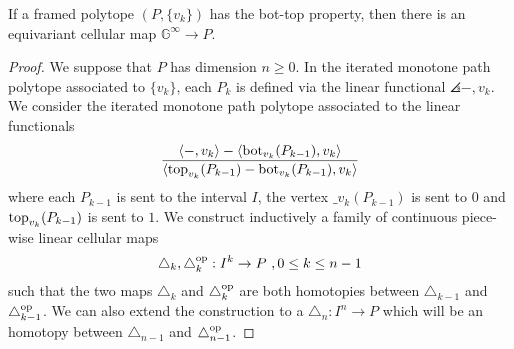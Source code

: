 \begin{theorem}
	\label{thm:map-from-the-globe}
	If a framed polytope $(P,\{v_k\})$ has the bot-top property, then there is an equivariant cellular map $\mathbb{G}^\infty \to P$.
\end{theorem}

\begin{proof}
	We suppose that $P$ has dimension $n\geq 0$. 
	In the iterated monotone path polytope associated to $\{v_k\}$, each $P_k$ is defined via the linear functional $\angles{-,v_k}$.
	We consider the iterated monotone path polytope associated to the linear functionals
	\begin{equation} \label{eq:new-projection}
		\frac{\langle-,v_k\rangle-\langle\operatorname{bot}_{v_k}(P_{k-1}),v_k\rangle}{\langle\operatorname{top}_{v_k}(P_{k-1})-\operatorname{bot}_{v_k}(P_{k-1}),v_k\rangle}
	\end{equation}
	where each $P_{k-1}$ is sent to the interval $I$, the vertex $\bm_{v_k}(P_{k-1})$ is sent to $0$ and $\operatorname{top}_{v_k}(P_{k-1})$ is sent to $1$.
	We construct inductively a family of continuous piece-wise linear cellular maps
	\[
	\triangle_k, \triangle_k^{\mathrm{op}}: I^k \to P \ , 0 \leq k \leq n-1
	\]
	such that the two maps $\triangle_k$ and $\triangle_k^{\mathrm{op}}$ are both homotopies between $\triangle_{k-1}$ and $\triangle_{k-1}^{\mathrm{op}}$.
	We can also extend the construction to a $\triangle_n : I^n \to P$ which will be an homotopy between $\triangle_{n-1}$ and $\triangle_{n-1}^{\mathrm{op}}$.


\end{proof}
